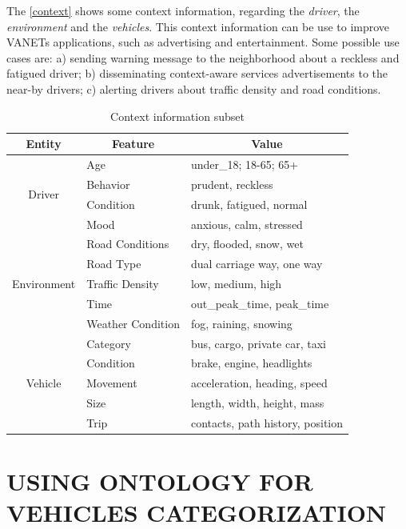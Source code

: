 \documentclass[letterpaper, 10 pt, conference]{ieeeconf}  %
\begin{document}
The \autoref{context} shows some context information, regarding the \emph{driver}, the \emph{environment} and the \emph{vehicles}. This context information can be use to improve VANETs applications, such as advertising and entertainment. Some possible use cases are: a) sending warning message to the neighborhood about a reckless and fatigued driver; b) disseminating context-aware services advertisements to the near-by drivers; c) alerting drivers about traffic density and road conditions.

\begin{table}[ht]
    \center
    \caption{Context information subset} \label{context}
    \begin{tabular}{|c|l|l|}
        \hline
        Entity & \multicolumn{1}{c|}{Feature} & \multicolumn{1}{c|}{Value} \\ \hline
        \multirow{4}{*}{Driver} & Age & under\_18; 18-65; 65+ \\ \cline{2-3}
        & Behavior & prudent, reckless \\ \cline{2-3}
        & Condition& drunk, fatigued, normal \\ \cline{2-3}
        & Mood & anxious, calm, stressed \\ \hline
        \multirow{5}{*}{Environment} & Road Conditions& dry, flooded, snow, wet \\ \cline{2-3}
        & Road Type& dual carriage way, one way \\ \cline{2-3}
        & Traffic Density& low, medium, high \\ \cline{2-3}
        & Time & out\_peak\_time, peak\_time \\ \cline{2-3}
        & Weather Condition& fog, raining, snowing \\ \hline
        \multirow{5}{*}{Vehicle} & Category & bus, cargo, private car, taxi \\ \cline{2-3}
        & Condition& brake, engine, headlights \\ \cline{2-3}
        & Movement & acceleration, heading, speed \\ \cline{2-3}
        & Size & length, width, height, mass \\ \cline{2-3}
        & Trip & contacts, path history, position \\ \hline
    \end{tabular}
\end{table}

\section{USING ONTOLOGY FOR VEHICLES CATEGORIZATION}
\end{document}
